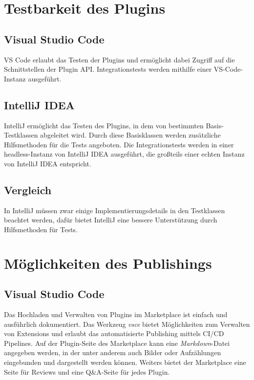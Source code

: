\section{Testbarkeit des Plugins}
\label{sec:Vergleich_Testbarkeit}

\subsection{Visual Studio Code}

VS Code erlaubt das Testen der Plugins und ermöglicht
dabei Zugriff auf die Schnittstellen der Plugin API.
Integrationstests werden mithilfe einer VS-Code-Instanz ausgeführt.

\subsection{IntelliJ IDEA}

IntelliJ ermöglicht das Testen des Plugins, in dem
von bestimmten Basis-Testklassen abgeleitet wird. Durch diese
Basisklassen werden zusätzliche Hilfsmethoden für die Tests
angeboten. Die Integrationstests werden in einer
headless-Instanz von IntelliJ IDEA ausgeführt, die großteils
einer echten Instanz von IntelliJ IDEA entspricht.

\subsection{Vergleich}

In IntelliJ müssen zwar einige Implementierungsdetails in den Testklassen
beachtet werden, dafür bietet IntelliJ eine bessere Unterstützung
durch Hilfsmethoden für Tests.


\section{Möglichkeiten des Publishings}
\label{sec:Vergleich_Publishing}

\subsection{Visual Studio Code}

Das Hochladen und Verwalten von Plugins im Marketplace ist
einfach und ausführlich dokumentiert. Das Werkzeug \emph{vsce}
bietet Möglichkeiten zum Verwalten von Extensions und 
erlaubt das automatisierte Publishing mittels CI/CD Pipelines.
Auf der Plugin-Seite des Marketplace kann eine \emph{Markdown}-Datei
angegeben werden, in der unter anderem auch Bilder oder Aufzählungen 
eingebunden und dargestellt werden können. 
Weiters bietet der Marketplace eine Seite für Reviews
und eine Q\&A-Seite für jedes Plugin.

